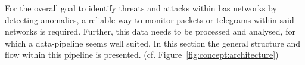 For the overall goal to identify threats and attacks within \gls{bas} networks by detecting anomalies, a reliable way to monitor packets or telegrams within said networks is required. Further, this data needs to be processed and analysed, for which a data-pipeline seems well suited.
In this section the general structure and flow within this pipeline is presented. (cf. Figure~\ref{fig:concept:architecture})

